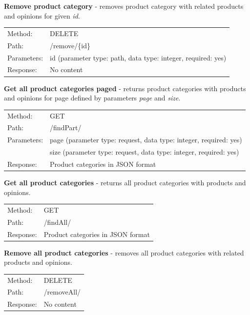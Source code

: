 \documentclass[12pt,a4paper]{article}
\begin{document}
\noindent\textbf{Remove product category} - removes product category with related products and opinions for given \textit{id}.

{\renewcommand{\arraystretch}{1}
  \begin{tabular}{ll}
  Method: & DELETE \\
  Path: & /remove/\{id\} \\
  Parameters: & id (parameter type: path, data type: integer, required: yes)\\
  Response: & No content  \\
  \end{tabular} \vspace{5mm}
}

\noindent\textbf{Get all product categories paged} - returns product categories with products and opinions for page defined by parameters \textit{page} and \textit{size}.

{\renewcommand{\arraystretch}{1}
  \begin{tabular}{ll}
  Method: & GET \\
  Path: & /findPart/ \\
  Parameters: & page (parameter type: request, data type: integer, required: yes)\\
              & size (parameter type: request, data type: integer, required: yes)\\
  Response: & Product categories in JSON format  \\
  \end{tabular} \vspace{5mm}
  }
  
\noindent\textbf{Get all product categories} - returns all product categories with products and opinions.

{\renewcommand{\arraystretch}{1}
  \begin{tabular}{ll}
  Method: & GET \\
  Path: & /findAll/ \\
  Response: & Product categories in JSON format  \\
  \end{tabular} \vspace{5mm}
}

\noindent\textbf{Remove all product categories} - removes all product categories with related products and opinions.

{\renewcommand{\arraystretch}{1}
  \begin{tabular}{ll}
  Method: & DELETE \\
  Path: & /removeAll/ \\
  Response: & No content  \\
  \end{tabular} \vspace{5mm}
}
  
\end{document}
